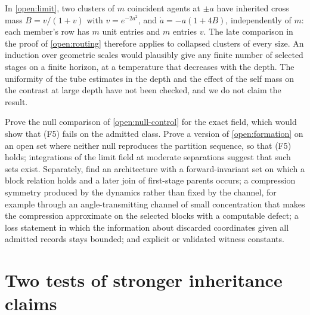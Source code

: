 In \cref{open:limit}, two clusters of $m$ coincident agents at $\pm a$ have inherited cross mass $B=v/(1+v)$ with $v=e^{-2a^2}$, and $\dot a=-a(1+4B)$, independently of $m$: each member's row has $m$ unit entries and $m$ entries $v$. The late comparison in the proof of \cref{open:routing} therefore applies to collapsed clusters of every size. An induction over geometric scales would plausibly give any finite number of selected stages on a finite horizon, at a temperature that decreases with the depth. The uniformity of the tube estimates in the depth and the effect of the self mass on the contrast at large depth have not been checked, and we do not claim the result.

Prove the null comparison of \cref{open:null-control} for the exact field, which would show that (F5) fails on the admitted class. Prove a version of \cref{open:formation} on an open set where neither null reproduces the partition sequence, so that (F5) holds; integrations of the limit field at moderate separations suggest that such sets exist. Separately, find an architecture with a forward-invariant set on which a block relation holds and a later join of first-stage parents occurs; a compression symmetry produced by the dynamics rather than fixed by the channel, for example through an angle-transmitting channel of small concentration that makes the compression approximate on the selected blocks with a computable defect; a loss statement in which the information about discarded coordinates given all admitted records stays bounded; and explicit or validated witness constants.

\section{Two tests of stronger inheritance claims}

